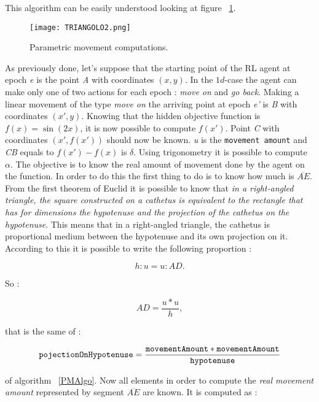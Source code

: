 This algorithm can be easily understood looking at figure ~\ref{fig:PMComputations}. 

\begin{figure} [h!]
	\centering
	\texttt{[image: TRIANGOLO2.png]}
	\caption{Parametric movement computations.}
	\label{fig:PMComputations}
\end{figure}

As previously done, let's suppose that the starting point of the RL agent at epoch \textit{e} is the point \textit{A} with coordinates $(x, y)$. In the $1d$-case the agent can make only one of two actions for each epoch : \textit{move on} and \textit{go back}. Making a linear movement of the type \textit{move on} the arriving point at epoch \textit{e'} is \textit{B} with coordinates $(x', y)$. Knowing that the hidden objective function is $f(x) = \sin(2x)$, it is now possible to compute $f(x')$. Point \textit{C} with coordinates $(x', f(x'))$ should now be known. \textit{u} is the {\tt movement amount} and \textit{CB} equals to $f(x') - f(x)$ is $\delta$. Using trigonometry it is possible to compute $\alpha$. The objective is to know the real amount of movement done by the agent on the function. In order to do this the first thing to do is to know how much is $\overline{AE}$.  From the first theorem of Euclid it is possible to know that \textit{in a right-angled triangle, the square constructed on a cathetus is equivalent to the rectangle that has for dimensions the hypotenuse and the projection of the cathetus on the hypotenuse}. This means that in a right-angled triangle, the cathetus is proportional medium between the hypotenuse and its own projection on it. According to this it is possible to write the following proportion :

\begin{equation}
	h : u =  u : AD.
\end{equation}

So :

\begin{equation}
	AD = \dfrac{u * u}{h},
\end{equation}

that is the same of :

\begin{equation}
	 {\tt pojectionOnHypotenuse} = \dfrac{{\tt movementAmount} * {\tt movementAmount}}{{\tt hypotenuse}}
\end{equation}

of algorithm ~\ref{PMAlgo}. Now all elements in order to compute the \textit{real movement amount} represented by segment $\overline{AE}$ are known. It is computed as :

